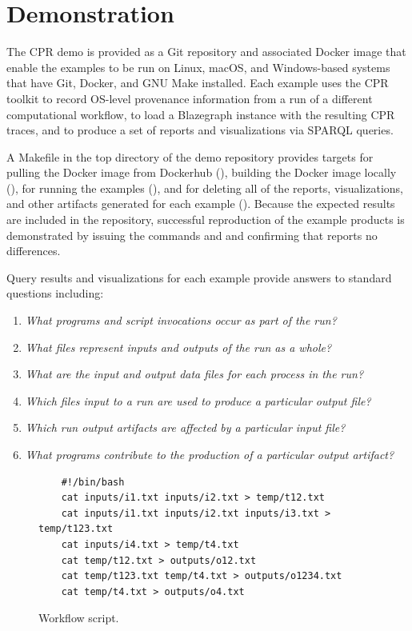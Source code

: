 \section{Demonstration}

The CPR demo is provided as a Git repository and associated Docker image that enable the examples to be run on Linux, macOS, and Windows-based systems that have Git, Docker, and GNU Make installed. Each example uses the CPR toolkit to record OS-level provenance information from a run of a different computational workflow, to load a Blazegraph instance with the resulting CPR traces, and to produce a set of reports and visualizations via SPARQL queries.
 
A Makefile in the top directory of the demo repository provides targets for pulling the Docker image from Dockerhub (), building the Docker image locally (), for running the examples (), and for deleting all of the reports, visualizations, and other artifacts generated for each example (). Because the expected results are included in the repository, successful reproduction of the example products is demonstrated by issuing the commands  and  and confirming that  reports no differences.

Query results and visualizations for each example provide answers to standard questions including:
\begin{enumerate}
\item \emph{What programs and script invocations occur as part of the run?}
\item \emph{What files represent inputs and outputs of the run as a whole?}
\item \emph{What are the input and output data files for each process in the run?}
\item \emph{Which files input to a run are used to produce a particular output file?}
\item \emph{Which run output artifacts are affected by a particular input file?}
\item \emph{What programs contribute to the production of a particular output artifact?}
\end{enumerate}

\begin{figure}[t]
\begin{verbatim}
    #!/bin/bash
    cat inputs/i1.txt inputs/i2.txt > temp/t12.txt
    cat inputs/i1.txt inputs/i2.txt inputs/i3.txt > temp/t123.txt
    cat inputs/i4.txt > temp/t4.txt
    cat temp/t12.txt > outputs/o12.txt
    cat temp/t123.txt temp/t4.txt > outputs/o1234.txt
    cat temp/t4.txt > outputs/o4.txt
\end{verbatim}
\vspace*{-1.5em}  %
        \caption{Workflow script.}
      \end{figure}

